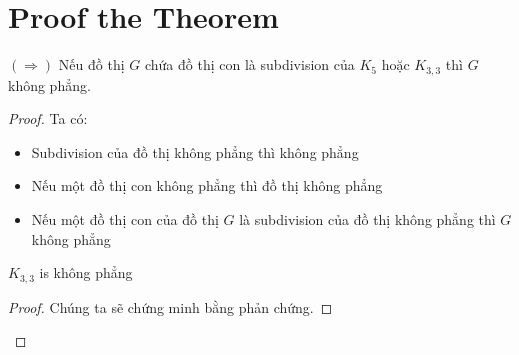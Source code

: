 \section{Proof the Theorem}
$(\Rightarrow)$  Nếu đồ thị $G$ chứa đồ thị con là subdivision của $K_5$ hoặc $K_{3,3}$ thì $G$ không phẳng. \\

\begin{proof}
    Ta có:
    \begin{itemize}
        \item Subdivision của đồ thị không phẳng thì không phẳng

        \item Nếu một đồ thị con không phẳng thì đồ thị không phẳng

        \item Nếu một đồ thị con của đồ thị $G$ là subdivision của đồ thị không phẳng thì $G$ không phẳng
    \end{itemize}
    \begin{lemma}
        $K_{3,3}$ is không phẳng
    \end{lemma}

    \begin{proof}
        Chúng ta sẽ chứng minh bằng phản chứng.


\end{proof}
\end{proof}
